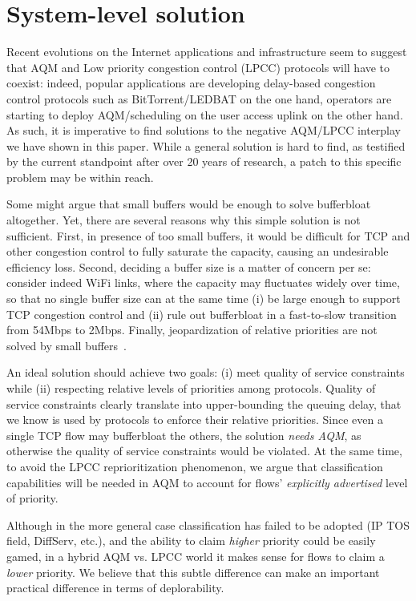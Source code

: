 \documentclass[conference]{IEEEtran}
\newcommand{\secL}[1]{\label{sec:#1}}
\begin{document}
\section{System-level solution}\secL{system}

Recent evolutions on the Internet applications and infrastructure seem to suggest that AQM and Low priority congestion control (LPCC) protocols will have to coexist: indeed, popular applications are developing delay-based congestion control protocols such as BitTorrent/LEDBAT on the one hand, operators are starting to deploy AQM/scheduling on the user access uplink on the other hand. As such, it is imperative to find solutions to the negative AQM/LPCC interplay we have shown in this paper. While a general solution is hard to find, as testified by the current standpoint after over 20 years of research, a patch to this specific problem may be within reach.

Some might argue that small buffers would be enough to solve bufferbloat altogether. Yet, there are several reasons why this simple solution is not sufficient. First, in presence of too small buffers, it would be difficult for TCP and other congestion control to fully saturate the capacity, causing an undesirable efficiency loss. Second, deciding a buffer size is a matter of concern per se: consider indeed WiFi links, where the capacity may fluctuates widely over time, so that no single buffer size can at the same time (i) be large enough to support TCP congestion control and (ii) rule out bufferbloat in a fast-to-slow transition from 54Mbps to 2Mbps. Finally, jeopardization of relative priorities are not solved by small buffers~\cite{tma13}.

An ideal solution should achieve two goals: (i) meet quality of service constraints while (ii) respecting relative levels of priorities among protocols. Quality of service constraints clearly translate into upper-bounding the queuing delay, that we know is used by protocols to enforce their relative priorities. 
Since even a single TCP flow may bufferbloat the others, the solution \emph{needs AQM}, as otherwise the quality of service constraints would be violated. At the same time, to avoid the LPCC reprioritization phenomenon, we argue that classification capabilities will be needed in AQM to account for flows' \emph{explicitly advertised} level of priority. 

Although in the more general case classification has failed to be adopted (IP TOS field, DiffServ, etc.), and the ability to claim \emph{higher} priority could be easily gamed, in a hybrid AQM vs. LPCC world it makes sense for flows to claim a \emph{lower} priority. We believe that this subtle difference can make an important practical difference in terms of deplorability.
\end{document}

